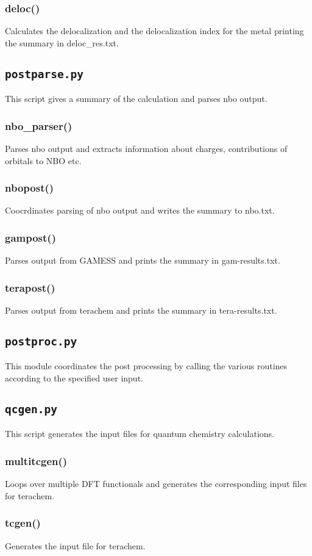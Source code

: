 \documentclass[a4paper,12pt]{assignment}
\begin{document}
\subsubsection{deloc()}
Calculates the delocalization and the delocalization index for the metal printing the summary in deloc\_res.txt.

\subsection{\texttt{postparse.py}}
This script gives a summary of the calculation and parses nbo output.
\subsubsection{nbo\_parser()}
Parses nbo output and extracts information about charges, contributions of orbitals to NBO etc. 
\subsubsection{nbopost()}
Coocrdinates parsing of nbo output and writes the summary to nbo.txt.
\subsubsection{gampost()}
Parses output from GAMESS and prints the summary in gam-results.txt.
\subsubsection{terapost()}
Parses output from terachem and prints the summary in tera-results.txt.

\subsection{\texttt{postproc.py}}
This module coordinates the post processing by calling the various routines according to the specified user input.

\subsection{\texttt{qcgen.py}}
This script generates the input files for quantum chemistry calculations.
\subsubsection{multitcgen()}
Loops over multiple DFT functionals and generates the corresponding input files for terachem.
\subsubsection{tcgen()}
Generates the input file for terachem.
\end{document}
